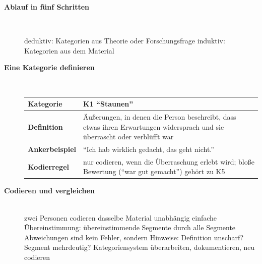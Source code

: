 \begin{description}
\item[{\rot\bf Ablauf in fünf Schritten}]~\\[-\lblskip]
\begin{center}
\end{center}
\bi
  \ite deduktiv: Kategorien aus Theorie oder Forschungsfrage
  \ite induktiv: Kategorien aus dem Material
\ei
\os{\newpage}

\item[{\rot\bf Eine Kategorie definieren}]~\\[-\lblskip]
\begin{center}
\small
\begin{tabular}{@{}p{}p{}@{}}
\toprule
\textbf{Kategorie} & K1 \enquote{Staunen} \\
\midrule
\textbf{Definition} & Äußerungen, in denen die Person beschreibt, dass
etwas ihren Erwartungen widersprach und sie überrascht oder verblüfft war \\
\textbf{Ankerbeispiel} & \enquote{Ich hab wirklich gedacht, das geht
nicht.} \\
\textbf{Kodierregel} & nur codieren, wenn die Überraschung erlebt wird;
bloße Bewertung (\enquote{war gut gemacht}) gehört zu K5 \\
\bottomrule
\end{tabular}
\end{center}
\os{\newpage}

\item[{\rot\bf Codieren und vergleichen}]~\\[-\lblskip]
\bi
  \ite zwei Personen codieren dasselbe Material unabhängig
  \ite einfache Übereinstimmung: übereinstimmende Segmente durch alle
    Segmente
  \ite Abweichungen sind kein Fehler, sondern Hinweise: Definition
    unscharf? Segment mehrdeutig?
  \ite Kategoriensystem überarbeiten, dokumentieren, neu codieren
\ei
{}
\os{\newpage}
\end{description}

